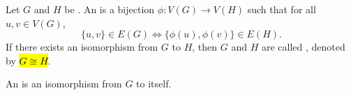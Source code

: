 \begin{definition} \label{definition:graph_isomorphism}
Let $G$ and $H$ be . An  is a bijection $\phi: V(G) \to V(H)$ such that for all $u, v \in V(G)$,
$$\{u,v\} \in E(G) \iff \{\phi(u), \phi(v)\} \in E(H).$$
If there exists an isomorphism from $G$ to $H$, then $G$ and $H$ are called , denoted by \hl{$G \cong H$}.

An  is an isomorphism from $G$ to itself.
\end{definition}
